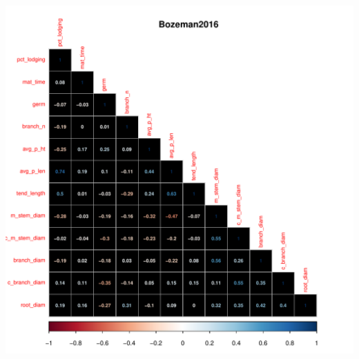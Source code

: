 \documentclass[11pt]{article}\usepackage[]{graphicx}\usepackage[]{color}
\makeatletter
\def\maxwidth{ %
  \ifdim\Gin@nat@width>\linewidth
    \linewidth
  \else
    \Gin@nat@width
  \fi
}
\newenvironment{knitrout}{}{} %
\makeatother
\begin{document}
\begin{knitrout}\footnotesize
{}\color{fgcolor}

{\centering \includegraphics[width=\maxwidth]{figure/bz-1} 

}



\end{knitrout}
\end{document}
